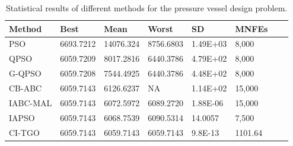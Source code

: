
\begin{table*}[tp]
    \tiny
    \begin{center}
    
    \begin{tabular}{ P{2.0cm} P{2.0cm} P{2.0cm} P{2.0cm} P{2.0cm} P{2.0cm} P{2.0cm} P{2.0cm}  }
    \hline
    \textbf{Method} & \textbf{Best} & \textbf{Mean} & \textbf{Worst} & \textbf{SD} & \textbf{MNFEs} \\
    \hline
    
    PSO & 6693.7212 & 14076.324 & 8756.6803 & 1.49E+03 & 8,000 \\
    QPSO & 6059.7209 & 8017.2816 & 6440.3786 & 4.79E+02 & 8,000 \\
    G-QPSO & 6059.7208 & 7544.4925 & 6440.3786 & 4.48E+02 & 8,000 \\
    CB-ABC & 6059.7143 & 6126.6237 & NA & 1.14E+02 & 15,000 \\
    IABC-MAL & 6059.7143 & 6072.5972 & 6089.2720 & 1.88E-06 & 15,000 \\
    IAPSO & 6059.7143 & 6068.7539 & 6090.5314 & 14.0057 & 7,500 \\
    CI-TGO & 6059.7143 & 6059.7143 & 6059.7143 & 9.8E-13 & 1101.64 \\
    
    \hline
    \end{tabular}
    \end{center}
    
    \caption{ Statistical results of different methods for the pressure vessel design problem. \\[1em]}
    \label{tab:PV}
    \end{table*}
    
    